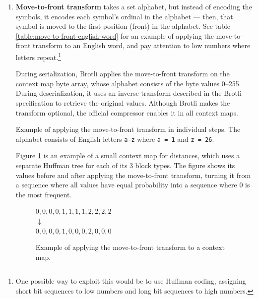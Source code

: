 \documentclass[english,master,dept460,male,cpp,cpdeclaration]{diploma}
\newcommand{\nosep}{\itemsep0em}
\newcommand{\texfigure}[1]{
}
\begin{document}
		\begin{enumerate} \nosep
			\item \textbf{Move-to-front transform} takes a set alphabet, but instead of encoding the symbols, it encodes each symbol's ordinal in the alphabet --- then, that symbol is moved to the first position (front) in the alphabet\cite{DataCompressionCompleteReference}. See table \ref{table:move-to-front-english-word} for an example of applying the move-to-front transform to an English word, and pay attention to low numbers where letters repeat.\footnote{One possible way to exploit this would be to use Huffman coding, assigning short bit sequences to low numbers and long bit sequences to high numbers.}
			
			During serialization, Brotli applies the move-to-front transform on the context map byte array, whose alphabet consists of the byte values 0--255. During deserialization, it uses an inverse transform described in the Brotli specification to retrieve the original values. Although Brotli makes the transform optional, the official compressor enables it in all context maps.
			
			\begin{table}[H]
				\centering
				\medskip
				\caption[Example of applying the move-to-front transform in individual steps.]{Example of applying the move-to-front transform in individual steps. The alphabet consists of English letters \texttt{a-z} where \texttt{a = 1} and \texttt{z = 26}.}
				\label{table:move-to-front-english-word}
				\texfigure{move-to-front-english-example}
			\end{table}
			
			\noindent
			Figure \ref{fig:move-to-front-context-map} is an example of a small context map for distances, which uses a separate Huffman tree for each of its 3 block types. The figure shows its values before and after applying the move-to-front transform, turning it from a sequence where all values have equal probability into a sequence where $0$ is the most frequent.
			
			\begin{figure}[H]
				\centering
				\smallskip
				$0, 0, 0, 0, 1, 1, 1, 1, 2, 2, 2, 2$
				\\
				$\downarrow$
				\\
				$0, 0, 0, 0, 1, 0, 0, 0, 2, 0, 0, 0$
				\caption{Example of applying the move-to-front transform to a context map.}
				\label{fig:move-to-front-context-map}
			\end{figure}
			

\end{enumerate}
\end{document}
